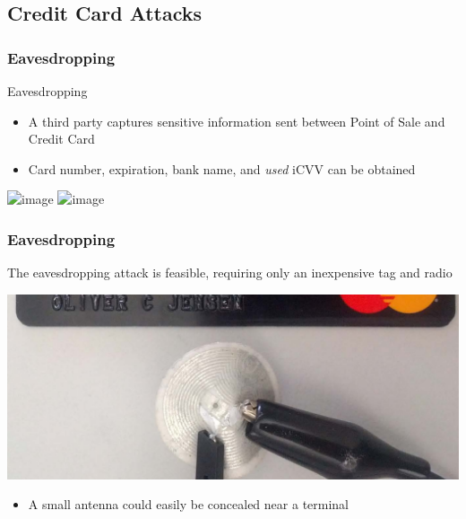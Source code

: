 \documentclass[unknownkeysallowed]{beamer}
\begin{document}
\subsection{Credit Card Attacks}
\begin{frame}
\frametitle{Eavesdropping}\centering
     \begin{minipage}{.7\textwidth}
              \begin{block}{Eavesdropping}
                \begin{itemize}
                  \item{A third party captures sensitive information sent between Point of Sale and Credit Card}
                  \item<3->{Card number, expiration, bank name, and \textit{used} iCVV can be obtained}
                \end{itemize}
              \end{block}
              \begin{center}
                \vspace{-6mm}
                \includegraphics<1>[width=\linewidth,height=\textheight,keepaspectratio]{figures/CCeaves0.png}
                \includegraphics<2->[width=\linewidth,height=\textheight,keepaspectratio]{figures/CCeaves.png}
              \end{center}
     \end{minipage}
\end{frame}

\begin{frame}
\frametitle{Eavesdropping}\centering
     \begin{minipage}{.7\textwidth}
          The eavesdropping attack is feasible, requiring only an inexpensive tag and radio
              \begin{center}
                \includegraphics[width=.7\linewidth,height=\textheight,keepaspectratio]{../TomPaper/figures/eavesdroppingAntenna.png}
              \end{center}
              \begin{itemize}
                \pause
                \item{A small antenna could easily be concealed near a terminal}
              \end{itemize}
     \end{minipage}
\end{frame}
\end{document}
